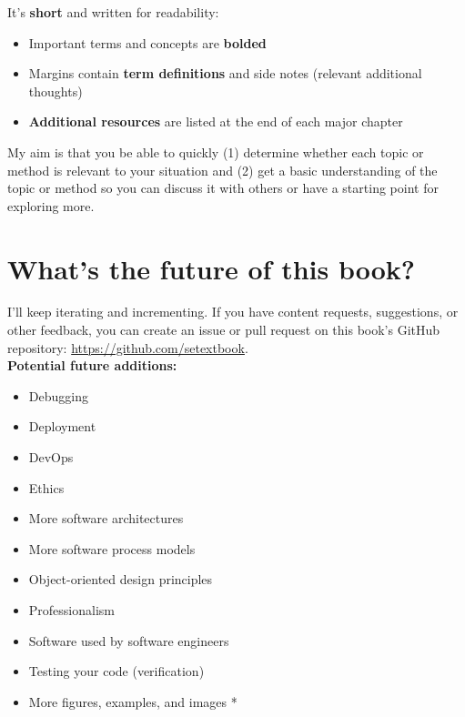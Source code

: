 \noindent It's \textbf{short} and written for readability:\\

\begin{itemize}
\item Important terms and concepts are \textbf{bolded}
\item Margins contain \textbf{term definitions} and side notes (relevant additional thoughts)
\item \textbf{Additional resources} are listed at the end of each major chapter\\
\end{itemize}

My aim is that you be able to quickly (1) determine whether each topic or method is relevant to your situation and (2) get a basic understanding of the topic or method so you can discuss it with others or have a starting point for exploring more.

\section{What's the future of this book?}

I'll keep iterating and incrementing. If you have content requests, suggestions, or other feedback, you can create an issue or pull request on this book's GitHub repository: \url{https://github.com/setextbook}. \\

\noindent \textbf{Potential future additions:}\\

\begin{itemize}
    \item Debugging
    \item Deployment
    \item DevOps
    \item Ethics
    \item More software architectures
    \item More software process models
    \item Object-oriented design principles
    \item Professionalism
    \item Software used by software engineers
    \item Testing your code (verification)
    \item More figures, examples, and images *
\end{itemize}

